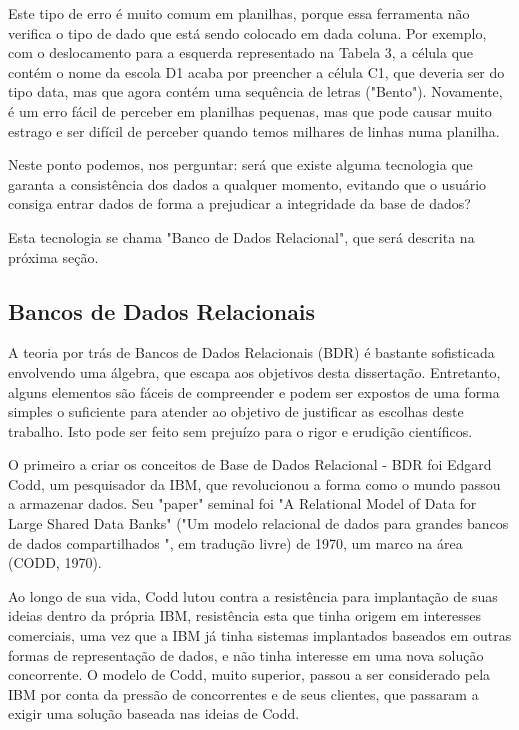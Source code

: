 Este tipo de erro é muito comum em  planilhas, porque essa ferramenta não verifica o tipo de dado que está sendo colocado em dada coluna. Por exemplo, com o deslocamento para a esquerda representado na Tabela 3, a célula que contém o nome da escola D1 acaba por preencher a célula C1, que deveria ser do tipo data, mas que agora contém uma sequência de letras ("Bento"). Novamente, é um erro fácil de perceber em planilhas pequenas, mas que pode causar muito estrago e ser difícil de perceber quando temos milhares de linhas numa planilha.

Neste ponto podemos, nos perguntar: será que existe alguma tecnologia que garanta a consistência dos dados a qualquer momento, evitando que o usuário consiga entrar dados de forma a prejudicar a integridade da base de dados?

Esta tecnologia se chama "Banco de Dados Relacional", que será descrita na próxima seção.

\subsection[Bancos de Dados Relacionais]{Bancos de Dados Relacionais}\label{Bancos de Dados Relacionais}
A teoria por trás de Bancos de Dados Relacionais (BDR) é bastante sofisticada envolvendo uma álgebra, que escapa aos objetivos desta dissertação. Entretanto, alguns elementos são fáceis de compreender e podem ser expostos  de uma forma simples o suficiente para atender ao objetivo de justificar as escolhas deste trabalho. Isto pode ser feito sem prejuízo para o rigor e erudição científicos.

O primeiro a criar os conceitos de Base de Dados Relacional - BDR foi Edgard Codd, um pesquisador da IBM, que revolucionou a forma como o mundo passou a armazenar dados. Seu "paper" seminal foi  "A Relational Model of Data for Large Shared Data Banks" ("Um modelo relacional de dados para grandes bancos de dados compartilhados ", em tradução livre) de 1970, um marco na área (CODD, 1970).

Ao longo de sua vida, Codd lutou contra a resistência para implantação de suas ideias dentro da própria IBM, resistência esta que tinha origem em interesses comerciais, uma vez que a IBM já tinha sistemas implantados baseados em outras formas de representação de dados, e não tinha interesse em uma nova solução concorrente. O modelo de Codd, muito superior, passou a ser considerado pela IBM por conta da pressão de concorrentes e de seus clientes, que passaram a exigir uma solução baseada nas ideias de Codd.

